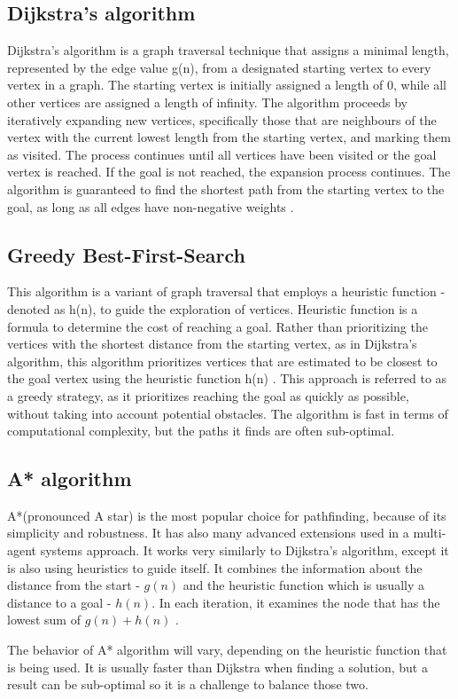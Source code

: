 \subsection{Dijkstra's algorithm}
Dijkstra's algorithm is a graph traversal technique that assigns a minimal length, represented by the edge value g(n), from a designated starting vertex to every vertex in a graph. The starting vertex is initially assigned a length of 0, while all other vertices are assigned a length of infinity. The algorithm proceeds by iteratively expanding new vertices, specifically those that are neighbours of the vertex with the current lowest length from the starting vertex, and marking them as visited. The process continues until all vertices have been visited or the goal vertex is reached. If the goal is not reached, the expansion process continues. The algorithm is guaranteed to find the shortest path from the starting vertex to the goal, as long as all edges have non-negative weights \cite{basic_algorithms, basic_2}.

\subsection{Greedy Best-First-Search}
This algorithm is a variant of graph traversal that employs a heuristic function - denoted as h(n), to guide the exploration of vertices. Heuristic function is a formula to determine the cost of reaching a goal. Rather than prioritizing the vertices with the shortest distance from the starting vertex, as in Dijkstra's algorithm, this algorithm prioritizes vertices that are estimated to be closest to the goal vertex using the heuristic function h(n) 
  \cite{a_star_dijkstra}. This approach is referred to as a greedy strategy, as it prioritizes reaching the goal as quickly as possible, without taking into account potential obstacles. The algorithm is fast in terms of computational complexity, but the paths it finds are often sub-optimal.

\subsection{A* algorithm}
A*(pronounced A star) is the most popular choice for pathfinding, because of its simplicity and robustness. It has also many advanced extensions used in a multi-agent systems approach. It works very similarly to Dijkstra's algorithm, except it is also using heuristics to guide itself. It combines the information about the distance from the start - \(g(n)\) and the heuristic function which is usually a distance to a goal - \(h(n)\). In each iteration, it examines the node that has the lowest sum of \(g(n) + h(n)\) \cite{basic_2}.

The behavior of A* algorithm will vary, depending on the heuristic function that is being used. It is usually faster than Dijkstra when finding a solution, but a result can be sub-optimal so it is a challenge to balance those two.
